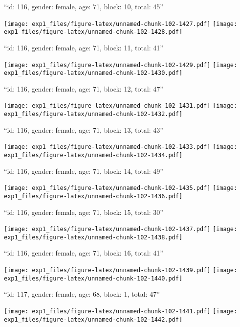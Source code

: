 \documentclass[11pt,,]{article}
\begin{document}
\newpage
[1] 

``id: 116, gender: female, age: 71, block: 10, total: 45''

\texttt{[image: exp1\_files/figure-latex/unnamed-chunk-102-1427.pdf]}
\texttt{[image: exp1\_files/figure-latex/unnamed-chunk-102-1428.pdf]}

\newpage
[1] 

``id: 116, gender: female, age: 71, block: 11, total: 41''

\texttt{[image: exp1\_files/figure-latex/unnamed-chunk-102-1429.pdf]}
\texttt{[image: exp1\_files/figure-latex/unnamed-chunk-102-1430.pdf]}

\newpage
[1] 

``id: 116, gender: female, age: 71, block: 12, total: 47''

\texttt{[image: exp1\_files/figure-latex/unnamed-chunk-102-1431.pdf]}
\texttt{[image: exp1\_files/figure-latex/unnamed-chunk-102-1432.pdf]}

\newpage
[1] 

``id: 116, gender: female, age: 71, block: 13, total: 43''

\texttt{[image: exp1\_files/figure-latex/unnamed-chunk-102-1433.pdf]}
\texttt{[image: exp1\_files/figure-latex/unnamed-chunk-102-1434.pdf]}

\newpage
[1] 

``id: 116, gender: female, age: 71, block: 14, total: 49''

\texttt{[image: exp1\_files/figure-latex/unnamed-chunk-102-1435.pdf]}
\texttt{[image: exp1\_files/figure-latex/unnamed-chunk-102-1436.pdf]}

\newpage
[1] 

``id: 116, gender: female, age: 71, block: 15, total: 30''

\texttt{[image: exp1\_files/figure-latex/unnamed-chunk-102-1437.pdf]}
\texttt{[image: exp1\_files/figure-latex/unnamed-chunk-102-1438.pdf]}

\newpage
[1] 

``id: 116, gender: female, age: 71, block: 16, total: 41''

\texttt{[image: exp1\_files/figure-latex/unnamed-chunk-102-1439.pdf]}
\texttt{[image: exp1\_files/figure-latex/unnamed-chunk-102-1440.pdf]}

\newpage
[1] 

``id: 117, gender: female, age: 68, block: 1, total: 47''

\texttt{[image: exp1\_files/figure-latex/unnamed-chunk-102-1441.pdf]}
\texttt{[image: exp1\_files/figure-latex/unnamed-chunk-102-1442.pdf]}
\end{document}

